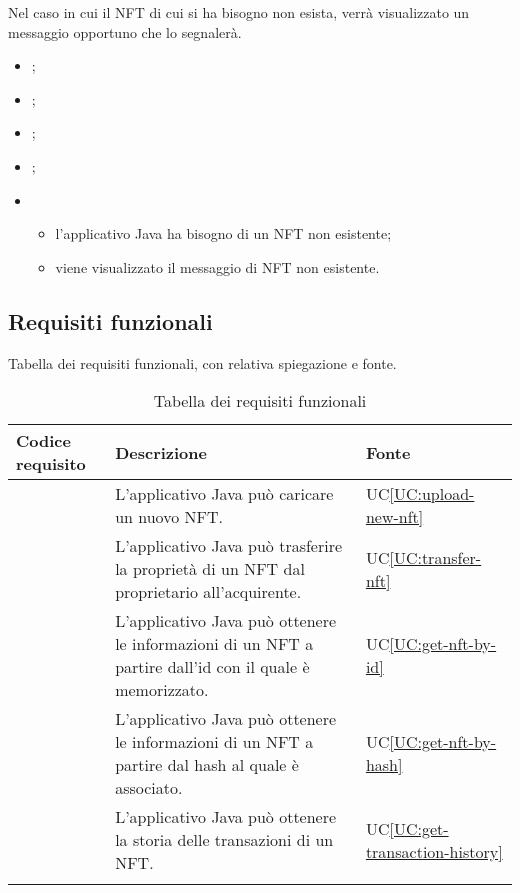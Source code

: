 Nel caso in cui il NFT di cui si ha bisogno non esista, verrà visualizzato un messaggio opportuno che lo segnalerà.

\begin{itemize}
  \item {};
  \item {};
  \item {};
  \item {};
  
  \item \UCMain
  \begin{itemize}
    \item l'applicativo Java ha bisogno di un NFT non esistente;
    \item viene visualizzato il messaggio di NFT non esistente.
  \end{itemize}
\end{itemize}

\subsection{Requisiti funzionali}
Tabella dei requisiti funzionali, con relativa spiegazione e fonte.

\begin{longtabu}{|X[0.8,c]|X[3,c]|X[0.5,c]|}
  \hline 

  \textbf{Codice requisito} & \textbf{Descrizione} & \textbf{Fonte} \\ 

  \hline

   & L'applicativo Java può caricare un nuovo NFT. & UC\ref{UC:upload-new-nft} \\
  
  \hline

   & L'applicativo Java può trasferire la proprietà di un NFT dal proprietario all'acquirente. & UC\ref{UC:transfer-nft} \\ 
  
  \hline

   & L'applicativo Java può ottenere le informazioni di un NFT a partire dall'id con il quale è memorizzato. & UC\ref{UC:get-nft-by-id} \\ 
  
  \hline

   & L'applicativo Java può ottenere le informazioni di un NFT a partire dal hash al quale è associato. & UC\ref{UC:get-nft-by-hash} \\ 
  
  \hline

   & L'applicativo Java può ottenere la storia delle transazioni di un NFT. & UC\ref{UC:get-transaction-history} \\ 
  
  \hline

  \caption{Tabella dei requisiti funzionali}
\end{longtabu}

